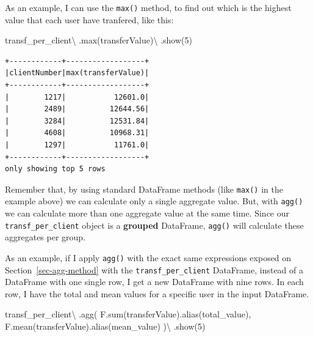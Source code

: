 \documentclass[
  11pt,
  letterpaper,
  DIV=11,
  numbers=noendperiod]{scrreprt}
\newenvironment{Shaded}{\begin{snugshade}}{\end{snugshade}}
\newcommand{\BuiltInTok}[1]{\textcolor[rgb]{0.00,0.23,0.31}{#1}}
\newcommand{\DecValTok}[1]{\textcolor[rgb]{0.68,0.00,0.00}{#1}}
\newcommand{\NormalTok}[1]{\textcolor[rgb]{0.00,0.23,0.31}{#1}}
\newcommand{\OperatorTok}[1]{\textcolor[rgb]{0.37,0.37,0.37}{#1}}
\newcommand{\StringTok}[1]{\textcolor[rgb]{0.13,0.47,0.30}{#1}}
\begin{document}
As an example, I can use the \texttt{max()} method, to find out which is
the highest value that each user have tranfered, like this:

\begin{Shaded}
\begin{Highlighting}[]
\NormalTok{transf\_per\_client}\OperatorTok{\textbackslash{}}
\NormalTok{  .}\BuiltInTok{max}\NormalTok{(}\StringTok{\textquotesingle{}transferValue\textquotesingle{}}\NormalTok{)}\OperatorTok{\textbackslash{}}
\NormalTok{  .show(}\DecValTok{5}\NormalTok{)}
\end{Highlighting}
\end{Shaded}

\begin{verbatim}
+------------+------------------+
|clientNumber|max(transferValue)|
+------------+------------------+
|        1217|           12601.0|
|        2489|          12644.56|
|        3284|          12531.84|
|        4608|          10968.31|
|        1297|           11761.0|
+------------+------------------+
only showing top 5 rows
\end{verbatim}

Remember that, by using standard DataFrame methods (like \texttt{max()}
in the example above) we can calculate only a single aggregate value.
But, with \texttt{agg()} we can calculate more than one aggregate value
at the same time. Since our \texttt{transf\_per\_client} object is a
\textbf{grouped} DataFrame, \texttt{agg()} will calculate these
aggregates per group.

As an example, if I apply \texttt{agg()} with the exact same expressions
exposed on Section~\ref{sec-agg-method} with the
\texttt{transf\_per\_client} DataFrame, instead of a DataFrame with one
single row, I get a new DataFrame with nine rows. In each row, I have
the total and mean values for a specific user in the input DataFrame.

\begin{Shaded}
\begin{Highlighting}[]
\NormalTok{transf\_per\_client}\OperatorTok{\textbackslash{}}
\NormalTok{  .agg(}
\NormalTok{    F.}\BuiltInTok{sum}\NormalTok{(}\StringTok{\textquotesingle{}transferValue\textquotesingle{}}\NormalTok{).alias(}\StringTok{\textquotesingle{}total\_value\textquotesingle{}}\NormalTok{),}
\NormalTok{    F.mean(}\StringTok{\textquotesingle{}transferValue\textquotesingle{}}\NormalTok{).alias(}\StringTok{\textquotesingle{}mean\_value\textquotesingle{}}\NormalTok{)}
\NormalTok{  )}\OperatorTok{\textbackslash{}}
\NormalTok{  .show(}\DecValTok{5}\NormalTok{)}
\end{Highlighting}
\end{Shaded}
\end{document}
